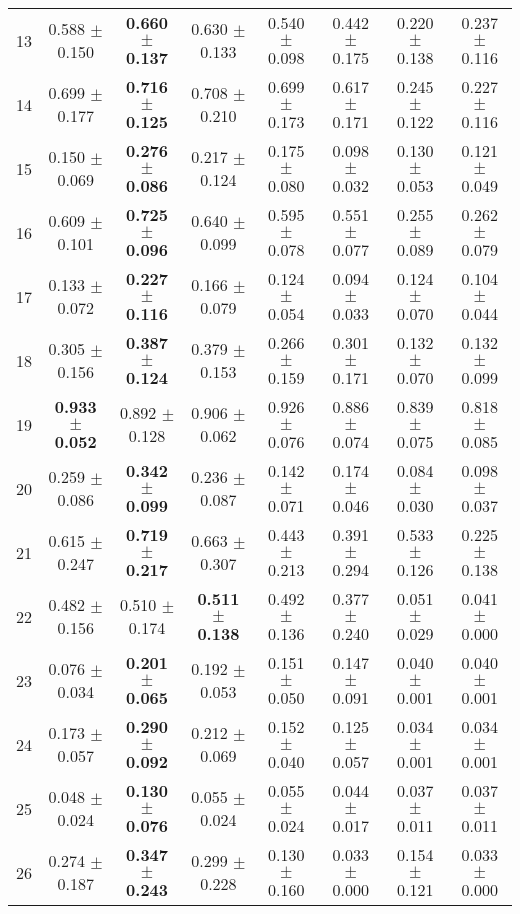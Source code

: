 \begin{table}[!ht]
{\begin{tabular}{r c c c c c c c}
13 & 0.588 $\pm$ 0.150 & \textbf{0.660 $\pm$ 0.137} & 0.630 $\pm$ 0.133 & 0.540 $\pm$ 0.098 & 0.442 $\pm$ 0.175 & 0.220 $\pm$ 0.138 & 0.237 $\pm$ 0.116 \\
14 & 0.699 $\pm$ 0.177 & \textbf{0.716 $\pm$ 0.125} & 0.708 $\pm$ 0.210 & 0.699 $\pm$ 0.173 & 0.617 $\pm$ 0.171 & 0.245 $\pm$ 0.122 & 0.227 $\pm$ 0.116 \\
15 & 0.150 $\pm$ 0.069 & \textbf{0.276 $\pm$ 0.086} & 0.217 $\pm$ 0.124 & 0.175 $\pm$ 0.080 & 0.098 $\pm$ 0.032 & 0.130 $\pm$ 0.053 & 0.121 $\pm$ 0.049 \\
16 & 0.609 $\pm$ 0.101 & \textbf{0.725 $\pm$ 0.096} & 0.640 $\pm$ 0.099 & 0.595 $\pm$ 0.078 & 0.551 $\pm$ 0.077 & 0.255 $\pm$ 0.089 & 0.262 $\pm$ 0.079 \\
17 & 0.133 $\pm$ 0.072 & \textbf{0.227 $\pm$ 0.116} & 0.166 $\pm$ 0.079 & 0.124 $\pm$ 0.054 & 0.094 $\pm$ 0.033 & 0.124 $\pm$ 0.070 & 0.104 $\pm$ 0.044 \\
18 & 0.305 $\pm$ 0.156 & \textbf{0.387 $\pm$ 0.124} & 0.379 $\pm$ 0.153 & 0.266 $\pm$ 0.159 & 0.301 $\pm$ 0.171 & 0.132 $\pm$ 0.070 & 0.132 $\pm$ 0.099 \\
19 & \textbf{0.933 $\pm$ 0.052} & 0.892 $\pm$ 0.128 & 0.906 $\pm$ 0.062 & 0.926 $\pm$ 0.076 & 0.886 $\pm$ 0.074 & 0.839 $\pm$ 0.075 & 0.818 $\pm$ 0.085 \\
20 & 0.259 $\pm$ 0.086 & \textbf{0.342 $\pm$ 0.099} & 0.236 $\pm$ 0.087 & 0.142 $\pm$ 0.071 & 0.174 $\pm$ 0.046 & 0.084 $\pm$ 0.030 & 0.098 $\pm$ 0.037 \\
21 & 0.615 $\pm$ 0.247 & \textbf{0.719 $\pm$ 0.217} & 0.663 $\pm$ 0.307 & 0.443 $\pm$ 0.213 & 0.391 $\pm$ 0.294 & 0.533 $\pm$ 0.126 & 0.225 $\pm$ 0.138 \\
22 & 0.482 $\pm$ 0.156 & 0.510 $\pm$ 0.174 & \textbf{0.511 $\pm$ 0.138} & 0.492 $\pm$ 0.136 & 0.377 $\pm$ 0.240 & 0.051 $\pm$ 0.029 & 0.041 $\pm$ 0.000 \\
23 & 0.076 $\pm$ 0.034 & \textbf{0.201 $\pm$ 0.065} & 0.192 $\pm$ 0.053 & 0.151 $\pm$ 0.050 & 0.147 $\pm$ 0.091 & 0.040 $\pm$ 0.001 & 0.040 $\pm$ 0.001 \\
24 & 0.173 $\pm$ 0.057 & \textbf{0.290 $\pm$ 0.092} & 0.212 $\pm$ 0.069 & 0.152 $\pm$ 0.040 & 0.125 $\pm$ 0.057 & 0.034 $\pm$ 0.001 & 0.034 $\pm$ 0.001 \\
25 & 0.048 $\pm$ 0.024 & \textbf{0.130 $\pm$ 0.076} & 0.055 $\pm$ 0.024 & 0.055 $\pm$ 0.024 & 0.044 $\pm$ 0.017 & 0.037 $\pm$ 0.011 & 0.037 $\pm$ 0.011 \\
26 & 0.274 $\pm$ 0.187 & \textbf{0.347 $\pm$ 0.243} & 0.299 $\pm$ 0.228 & 0.130 $\pm$ 0.160 & 0.033 $\pm$ 0.000 & 0.154 $\pm$ 0.121 & 0.033 $\pm$ 0.000 \\

\end{tabular}}
\end{table}
